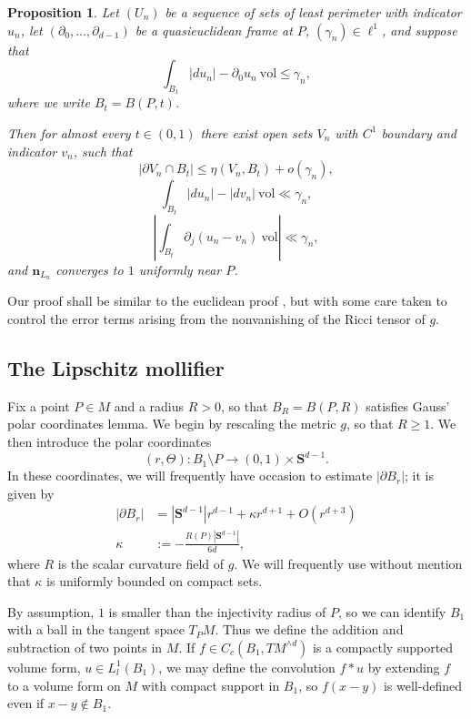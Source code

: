 \documentclass[reqno,12pt,letterpaper]{amsart}
\newcommand{\Sph}{\mathbf S}
\newcommand{\normal}{\mathbf n}
\newcommand{\vol}{\mathrm{vol}}
\newtheorem{proposition}[theorem]{Proposition}
\theoremstyle{definition}
\numberwithin{equation}{section}
\begin{document}
\begin{proposition}\label{mollifier proposition}
Let $(U_n)$ be a sequence of sets of least perimeter with indicator $u_n$, let $(\partial_0, \dots, \partial_{d - 1})$ be a quasieuclidean frame at $P$, $(\gamma_n) \in \ell^1$, and suppose that
$$\int_{B_1} |du_n| - \partial_0u_n ~\vol \leq \gamma_n,$$
where we write $B_t = B(P, t)$.

Then for almost every $t \in (0, 1)$ there exist open sets $V_n$ with $C^1$ boundary and indicator $v_n$, such that
$$|\partial V_n \cap B_t| \leq \eta(V_n, B_t) + o(\gamma_n),$$
$$\int_{B_t} |du_n| - |dv_n| ~\vol \ll \gamma_n,$$
$$\left|\int_{B_t} \partial_j(u_n - v_n)~\vol\right| \ll \gamma_n,$$
and $\normal_{L_n}$ converges to $1$ uniformly near $P$.
\end{proposition}

Our proof shall be similar to the euclidean proof \cite[Lemma 5.5]{Miranda66}, but with some care taken to control the error terms arising from the nonvanishing of the Ricci tensor of $g$.


\subsection{The Lipschitz mollifier}
Fix a point $P \in M$ and a radius $R > 0$, so that $B_R = B(P, R)$ satisfies Gauss' polar coordinates lemma.
We begin by rescaling the metric $g$, so that $R \geq 1$.
We then introduce the polar coordinates
$$(r, \Theta): B_1 \setminus P \to (0, 1) \times \Sph^{d - 1}.$$
In these coordinates, we will frequently have occasion to estimate $|\partial B_r|$; it is given by
\begin{align}\label{area of sphere form}
|\partial B_r| &= |\Sph^{d - 1}|r^{d - 1} + \kappa r^{d + 1} + O(r^{d + 3})\\
\label{normalized scalar curvature}
\kappa &:= -\frac{R(P)|\Sph^{d - 1}|}{6d},
\end{align}
where $R$ is the scalar curvature field of $g$.
We will frequently use without mention that $\kappa$ is uniformly bounded on compact sets.

By assumption, $1$ is smaller than the injectivity radius of $P$, so we can identify $B_1$ with a ball in the tangent space $T_PM$.
Thus we define the addition and subtraction of two points in $M$.
If $f \in C_c(B_1, TM^{\wedge d})$ is a compactly supported volume form, $u \in L^1_l(B_1)$, we may define the convolution $f * u$ by extending $f$ to a volume form on $M$ with compact support in $B_1$, so $f(x - y)$ is well-defined even if $x - y \notin B_1$.
\end{document}
